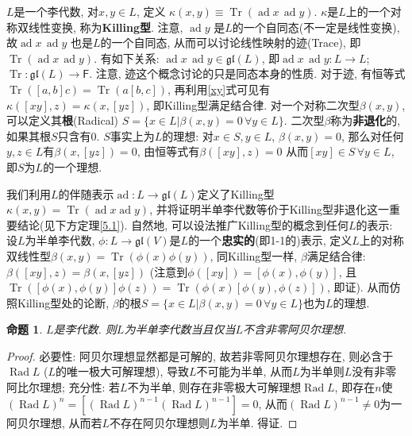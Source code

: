 \documentclass{ctexart}%
\newtheorem{proposition}{命题}
\theoremstyle{definition}
\theoremstyle{remark}
\DeclareMathOperator{\ad}{ad}
\DeclareMathOperator{\Tr}{Tr}
\DeclareMathOperator{\Rad}{Rad}
\begin{document}
 



$L$是一个李代数, 对$x,y\in L$, 定义 $\kappa(x,y)\equiv \Tr (\ad x\,\ad y)$. $\kappa$是$L$上的一个对称双线性变换, 称为\textbf{Killing型}. 注意, $\ad y$ 是$L$的一个自同态(不一定是线性变换), 故$\ad x\,\ad y$ 也是$L$的一个自同态, 从而可以讨论线性映射的迹(Trace), 即$\Tr (\ad x\,\ad y)$. 有如下关系: $\ad x\,\ad y \in \mathfrak{gl}(L)$, 即$\ad x\,\ad y\colon L\rightarrow L$; $\Tr \colon \mathfrak{gl}(L)\rightarrow \mathsf{F}$. 注意, 迹这个概念讨论的只是同态本身的性质.
对于迹, 有恒等式$\Tr ([a,b]c)=\Tr (a[b,c])$, 再利用\eqref{xy}式可见有$\kappa([xy],z)=\kappa(x,[yz])$, 即Killing型满足结合律. 对一个对称二次型$\beta(x,y)$, 可以定义其\textbf{根}(Radical) $S=\{x\in L|\beta(x,y)=0\,\forall y\in L\}$. 二次型$\beta$称为\textbf{非退化}的, 如果其根$S$只含有0. $S$事实上为$L$的理想: 对$x\in S,y\in L$, $\beta(x,y)=0$, 那么对任何$y,z\in L$有$\beta(x,[yz])=0$, 由恒等式有$\beta([xy],z)=0$ 从而$[xy] \in S \,\forall y\in L$, 即$S$为$L$的一个理想. 

我们利用$L$的伴随表示$\ad\colon L\rightarrow \mathfrak{gl}(L)$定义了Killing型$\kappa(x,y)=\Tr(\ad x\ad y)$, 并将证明半单李代数等价于Killing型非退化这一重要结论(见下方定理\ref{5.1}). 自然地, 可以设法推广Killing型的概念到任何$L$的表示: 设$L$为半单李代数, $\phi\colon L\rightarrow \mathfrak{gl}(V)$是$L$的一个\textbf{忠实的}(即1-1的)表示, 定义$L$上的对称双线性型$\beta(x,y)=\Tr(\phi(x)\phi(y))$, 同Killing型一样, $\beta$满足结合律: $\beta([xy],z)=\beta(x,[yz])$ (注意到$\phi([xy])=[\phi(x),\phi(y)]$, 且$\Tr([\phi(x),\phi(y)]\phi(z))=\Tr(\phi(x)[\phi(y),\phi(z)])$, 即证). 从而仿照Killing型处的论断, $\beta$的根$S=\{x\in L|\beta(x,y)=0\,\forall y\in L\}$也为$L$的理想.


\begin{proposition}\label{5.0}
$L$是李代数. 则$L$为半单李代数当且仅当$L$不含非零阿贝尔理想.
\end{proposition}
\begin{proof}
必要性: 阿贝尔理想显然都是可解的, 故若非零阿贝尔理想存在, 则必含于$\Rad L$ ($L$的唯一极大可解理想), 导致$L$不可能为半单, 从而$L$为半单则$L$没有非零阿比尔理想; 充分性: 若$L$不为半单, 则存在非零极大可解理想$\Rad L$, 即存在$n$使$(\Rad L)^n=[(\Rad L)^{n-1}(\Rad L)^{n-1}]=0$, 从而$(\Rad L)^{n-1}\neq 0$为一阿贝尔理想, 从而若$L$不存在阿贝尔理想则$L$为半单. 得证. 
\end{proof}
\end{document}
